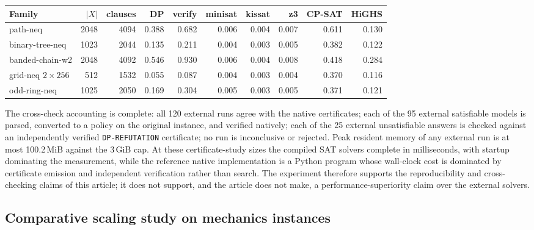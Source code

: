 \documentclass[11pt]{article}
\theoremstyle{plain}
\theoremstyle{definition}
\theoremstyle{remark}
\begin{document}
\begin{center}
\begin{tabular}{@{}lrrrrrrrrr@{}}
\toprule
Family & $|X|$ & clauses & DP & verify & minisat & kissat & z3 & CP-SAT & HiGHS\\
\midrule
path-neq & 2048 & 4094 & 0.388 & 0.682 & 0.006 & 0.004 & 0.007 & 0.611 & 0.130\\
binary-tree-neq & 1023 & 2044 & 0.135 & 0.211 & 0.004 & 0.003 & 0.005 & 0.382 & 0.122\\
banded-chain-w2 & 2048 & 4092 & 0.546 & 0.930 & 0.006 & 0.004 & 0.008 & 0.418 & 0.284\\
grid-neq $2\times 256$ & 512 & 1532 & 0.055 & 0.087 & 0.004 & 0.003 & 0.004 & 0.370 & 0.116\\
odd-ring-neq & 1025 & 2050 & 0.169 & 0.304 & 0.005 & 0.003 & 0.005 & 0.371 & 0.121\\
\bottomrule
\end{tabular}
\label{tab:external-baselines}
\end{center}

The cross-check accounting is complete: all 120 external runs agree with the
native certificates; each of the 95 external satisfiable models is parsed,
converted to a policy on the original instance, and verified natively; each of
the 25 external unsatisfiable answers is checked against an independently
verified \texttt{DP-REFUTATION} certificate; no run is inconclusive or
rejected.  Peak resident memory of any external run is at most 100.2\,MiB
against the 3\,GiB cap.  At these certificate-study sizes the
compiled SAT solvers complete in milliseconds, with startup dominating the
measurement, while the reference native implementation is a Python program
whose wall-clock cost is dominated by certificate emission and independent
verification rather than search.  The experiment therefore supports the
reproducibility and cross-checking claims of this article; it does not support,
and the article does not make, a performance-superiority claim over the
external solvers.

\subsection{Comparative scaling study on mechanics instances}
\label{subsec:mechanics-baselines}
\end{document}
